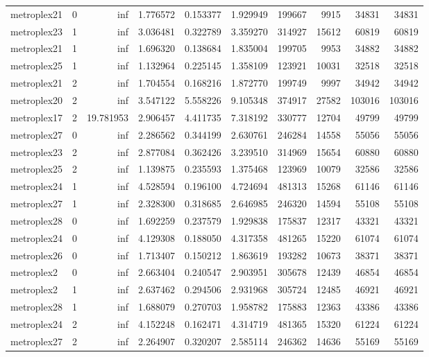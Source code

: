 \begin{longtable}{|l|r|r|r|r|r|r|r|r|r|}
metroplex21 & 0 & inf & 1.776572 & 0.153377 & 1.929949 & 199667 & 9915 & 34831 & 34831 \\
metroplex23 & 1 & inf & 3.036481 & 0.322789 & 3.359270 & 314927 & 15612 & 60819 & 60819 \\
metroplex21 & 1 & inf & 1.696320 & 0.138684 & 1.835004 & 199705 & 9953 & 34882 & 34882 \\
metroplex25 & 1 & inf & 1.132964 & 0.225145 & 1.358109 & 123921 & 10031 & 32518 & 32518 \\
metroplex21 & 2 & inf & 1.704554 & 0.168216 & 1.872770 & 199749 & 9997 & 34942 & 34942 \\
metroplex20 & 2 & inf & 3.547122 & 5.558226 & 9.105348 & 374917 & 27582 & 103016 & 103016 \\
metroplex17 & 2 & 19.781953 & 2.906457 & 4.411735 & 7.318192 & 330777 & 12704 & 49799 & 49799 \\
metroplex27 & 0 & inf & 2.286562 & 0.344199 & 2.630761 & 246284 & 14558 & 55056 & 55056 \\
metroplex23 & 2 & inf & 2.877084 & 0.362426 & 3.239510 & 314969 & 15654 & 60880 & 60880 \\
metroplex25 & 2 & inf & 1.139875 & 0.235593 & 1.375468 & 123969 & 10079 & 32586 & 32586 \\
metroplex24 & 1 & inf & 4.528594 & 0.196100 & 4.724694 & 481313 & 15268 & 61146 & 61146 \\
metroplex27 & 1 & inf & 2.328300 & 0.318685 & 2.646985 & 246320 & 14594 & 55108 & 55108 \\
metroplex28 & 0 & inf & 1.692259 & 0.237579 & 1.929838 & 175837 & 12317 & 43321 & 43321 \\
metroplex24 & 0 & inf & 4.129308 & 0.188050 & 4.317358 & 481265 & 15220 & 61074 & 61074 \\
metroplex26 & 0 & inf & 1.713407 & 0.150212 & 1.863619 & 193282 & 10673 & 38371 & 38371 \\
metroplex2 & 0 & inf & 2.663404 & 0.240547 & 2.903951 & 305678 & 12439 & 46854 & 46854 \\
metroplex2 & 1 & inf & 2.637462 & 0.294506 & 2.931968 & 305724 & 12485 & 46921 & 46921 \\
metroplex28 & 1 & inf & 1.688079 & 0.270703 & 1.958782 & 175883 & 12363 & 43386 & 43386 \\
metroplex24 & 2 & inf & 4.152248 & 0.162471 & 4.314719 & 481365 & 15320 & 61224 & 61224 \\
metroplex27 & 2 & inf & 2.264907 & 0.320207 & 2.585114 & 246362 & 14636 & 55169 & 55169 \\

\end{longtable}
